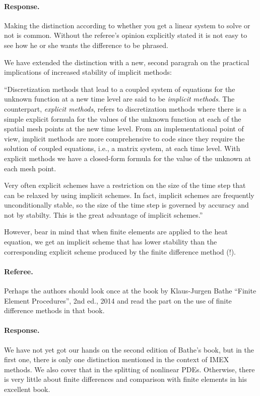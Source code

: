 \documentclass[%
oneside,                 %
final,                   %
10pt]{article}
\begin{document}
\paragraph{Response.}
Making the distinction according to whether you get a linear system to solve
or not is common. Without the referee's opinion explicitly stated it is not
easy to see how he or she wants the difference to be phrased.

We have extended the distinction with a new, second paragrah on the practical
implications of increased stability of implicit methods:

``Discretization methods that lead to a coupled system of equations for
the unknown function at a new time level are said to be \emph{implicit
methods}.  The counterpart, \emph{explicit methods}, refers to
discretization methods where there is a simple explicit formula for
the values of the unknown function at each of the spatial mesh points
at the new time level. From an implementational point of view,
implicit methods are more comprehensive to code since they require the
solution of coupled equations, i.e., a matrix system, at each time
level.  With explicit methods we have a closed-form formula for the
value of the unknown at each mesh point.

Very often explicit schemes have a restriction on the size of the time
step that can be relaxed by using implicit schemes. In fact,
implicit schemes are frequently unconditionally stable, so the size of the
time step is governed by accuracy and not by stabilty. This is the great
advantage of implicit schemes.''

However, bear in mind that when finite elements are applied to the heat
equation, we get an implicit scheme that has lower stability than the
corresponding explicit scheme produced by the finite difference method (!).

\paragraph{Referee.}
Perhaps the authors should look once at the book by Klaus-Jurgen Bathe ``Finite Element Procedures'', 2nd ed., 2014 and read the part on the use of finite difference methods in that book.

\paragraph{Response.}
We have not yet got our hands on the second edition of Bathe's book, but in
the first one, there is only one distinction mentioned in the context of IMEX
methods. We also cover that in the splitting of nonlinear PDEs. Otherwise,
there is very little about finite differences and comparison with finite
elements in his excellent book.
\end{document}
